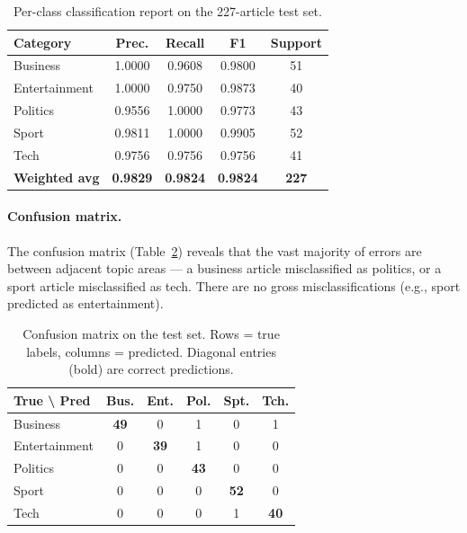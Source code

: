 \begin{table}[h]
\centering
\begin{tabular}{lcccc}
\toprule
\textbf{Category} & \textbf{Prec.} & \textbf{Recall} & \textbf{F1} & \textbf{Support} \\
\midrule
Business      & 1.0000 & 0.9608 & 0.9800 & 51 \\
Entertainment & 1.0000 & 0.9750 & 0.9873 & 40 \\
Politics      & 0.9556 & 1.0000 & 0.9773 & 43 \\
Sport         & 0.9811 & 1.0000 & 0.9905 & 52 \\
Tech          & 0.9756 & 0.9756 & 0.9756 & 41 \\
\midrule
\textbf{Weighted avg} & \textbf{0.9829} & \textbf{0.9824} & \textbf{0.9824} & \textbf{227} \\
\bottomrule
\end{tabular}
\caption{Per-class classification report on the 227-article test set.}
\label{tab:classification_report}
\end{table}

\paragraph{Confusion matrix.}
The confusion matrix (Table~\ref{tab:confusion}) reveals that the vast majority of errors are between adjacent topic areas — a business article misclassified as politics, or a sport article misclassified as tech. There are no gross misclassifications (e.g., sport predicted as entertainment).

\begin{table}[h]
\centering
\setlength{\tabcolsep}{4pt}
\begin{tabular}{lccccc}
\toprule
\textbf{True \textbackslash{} Pred} & \textbf{Bus.} & \textbf{Ent.} & \textbf{Pol.} & \textbf{Spt.} & \textbf{Tch.} \\
\midrule
Business      & \textbf{49} & 0 & 1 & 0 & 1 \\
Entertainment & 0 & \textbf{39} & 1 & 0 & 0 \\
Politics      & 0 & 0 & \textbf{43} & 0 & 0 \\
Sport         & 0 & 0 & 0 & \textbf{52} & 0 \\
Tech          & 0 & 0 & 0 & 1 & \textbf{40} \\
\bottomrule
\end{tabular}
\caption{Confusion matrix on the test set. Rows = true labels, columns = predicted. Diagonal entries (bold) are correct predictions.}
\label{tab:confusion}
\end{table}

